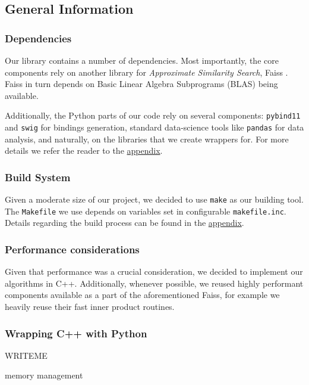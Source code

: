 
\subsection{General Information}


\subsubsection{Dependencies}

Our library contains a number of dependencies. Most importantly, the core components rely on 
another library for \textit{Approximate Similarity Search}, Faiss \cite{faiss}.
Faiss in turn depends on Basic Linear Algebra Subprograms (BLAS) being available.

Additionally, the Python parts of our code rely on several components: \texttt{pybind11} and \texttt{swig}
for bindings generation, standard data-science tools like \texttt{pandas} for data analysis, and naturally, on the
libraries that we create wrappers for. For more details we refer the reader to the \hyperref[sec:appendices]{appendix}.

\subsubsection{Build System}

Given a moderate size of our project, we decided to use \texttt{make} as our building tool. The \texttt{Makefile} we use
depends on variables set in configurable \texttt{makefile.inc}. Details regarding the build process can be found in the \hyperref[sec:appendices]{appendix}.

\subsubsection{Performance considerations}

Given that performance was a crucial consideration, we decided to implement our algorithms in C++.
Additionally, whenever possible, we reused highly performant components available as a part of the aforementioned Faiss,
for example we heavily reuse their fast inner product routines. 

\subsubsection{Wrapping C++ with Python}

WRITEME

memory management

